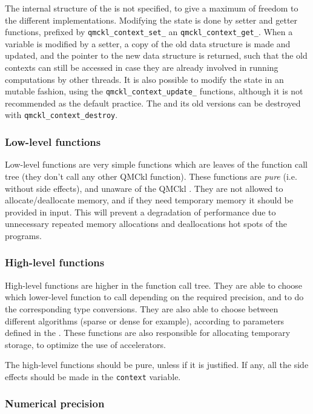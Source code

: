 The internal structure of the {\context}  is not specified, to give a
maximum of  freedom to  the different  implementations.  Modifying
the  state   is  done   by  setter   and  getter functions,   prefixed  by
\texttt{qmckl_context_set_}  an
\texttt{qmckl_context_get_}.
When a {\context} variable is modified by a setter, a copy of the old
data structure is made and updated, and the pointer to the new data
structure is returned, such that the old contexts can still be
accessed in case they are already involved in running computations by
other threads. It is also possible to modify the state in an mutable
fashion, using the \texttt{qmckl_context_update_} functions,
although it is not recommended as the default practice.
The {\context} and its old versions can be destroyed with
\texttt{qmckl_context_destroy}.


\subsubsection{Low-level functions}

Low-level functions are very simple functions which are leaves of
the function call tree (they don't call any other \ac{QMCkl} function).
These  functions   are   \emph{pure} (i.e. without side effects), and
unaware of the \ac{QMCkl} {\context}. They are not allowed to
allocate/deallocate memory, and if they need temporary memory it
should be provided in input. This will prevent a degradation of
performance due to unnecessary repeated memory allocations and
deallocations hot spots of the programs.


\subsubsection{High-level functions}

High-level functions  are higher in the function  call tree.
They  are  able  to  choose which  lower-level  function  to  call
depending on the required precision, and to do the corresponding type
conversions. They are also able to choose between different algorithms
(sparse or dense for example), according to parameters defined in the
{\context}.  These functions are also responsible for allocating
temporary storage, to optimize the use of accelerators.

The high-level functions should be pure, unless if it is
justified. If any, all the side effects should be made in the
\texttt{context} variable.

\subsubsection{Numerical precision}


